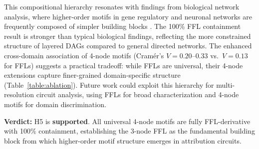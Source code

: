This compositional hierarchy resonates with findings from biological network analysis, where higher-order motifs in gene regulatory and neuronal networks are frequently composed of simpler building blocks \cite{milo2004superfamilies, benson2016higher}. The 100\% FFL containment result is stronger than typical biological findings, reflecting the more constrained structure of layered DAGs compared to general directed networks. The enhanced cross-domain association of 4-node motifs (Cram\'{e}r's $V=0.20$--$0.33$ vs.\ $V=0.13$ for FFLs) suggests a practical tradeoff: while FFLs are universal, their 4-node extensions capture finer-grained domain-specific structure (Table~\ref{table:ablation}). Future work could exploit this hierarchy for multi-resolution circuit analysis, using FFLs for broad characterization and 4-node motifs for domain discrimination.

\textbf{Verdict:} H5 is \textbf{supported}. All universal 4-node motifs are fully FFL-derivative with 100\% containment, establishing the 3-node FFL as the fundamental building block from which higher-order motif structure emerges in attribution circuits.